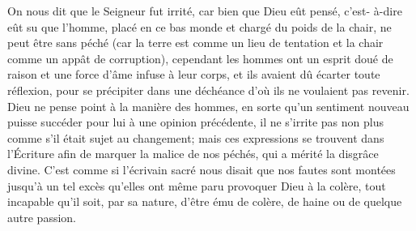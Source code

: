 On nous dit que le Seigneur fut irrité,
	car bien que Dieu eût pensé, c’est- à-dire eût su que l’homme,
		placé en ce bas monde et chargé du poids de la chair,
	ne peut être sans péché (car la terre est comme un lieu de tentation
		et la chair comme un appât de corruption),
	cependant les hommes ont un esprit doué de raison
	et une force d’âme infuse à leur corps,
	et ils avaient dû écarter toute réflexion,
	pour se précipiter dans une déchéance d’où ils ne voulaient pas revenir.
Dieu ne pense point à la manière des hommes,
	en sorte qu’un sentiment nouveau
		puisse succéder pour lui à une opinion précédente,
	il ne s’irrite pas non plus comme s’il était sujet au changement;
	mais ces expressions se trouvent dans l’Écriture
	afin de marquer la malice de nos péchés, qui a mérité la disgrâce divine.
C’est comme si l’écrivain sacré nous disait
	que nos fautes sont montées jusqu’à un tel excès
	qu’elles ont même paru provoquer Dieu à la colère,
	tout incapable qu’il soit, par sa nature,
	d’être ému de colère, de haine ou de quelque autre passion.
